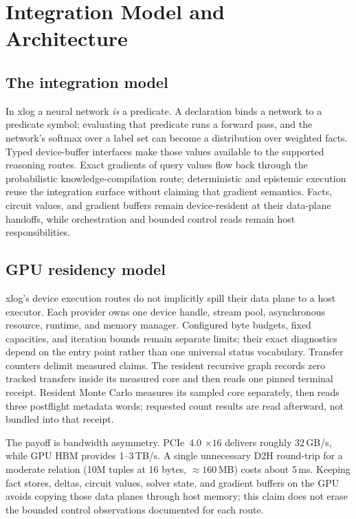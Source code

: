 \section{Integration Model and Architecture}\label{sec:arch}

\subsection{The integration model}

In xlog a neural network \emph{is} a predicate. A declaration binds a network to a predicate symbol; evaluating that predicate runs a forward pass, and the network's softmax over a label set can become a distribution over weighted facts. Typed device-buffer interfaces make those values available to the supported reasoning routes. Exact gradients of query values flow back through the probabilistic knowledge-compilation route; deterministic and epistemic execution reuse the integration surface without claiming that gradient semantics. Facts, circuit values, and gradient buffers remain device-resident at their data-plane handoffs, while orchestration and bounded control reads remain host responsibilities.
\subsection{GPU residency model}

xlog's device execution routes do not implicitly spill their data plane to a host executor. Each provider owns one device handle, stream pool, asynchronous resource, runtime, and memory manager. Configured byte budgets, fixed capacities, and iteration bounds remain separate limits; their exact diagnostics depend on the entry point rather than one universal status vocabulary. Transfer counters delimit measured claims. The resident recursive graph records zero tracked transfers inside its measured core and then reads one pinned terminal receipt. Resident Monte Carlo measures its sampled core separately, then reads three postflight metadata words; requested count results are read afterward, not bundled into that receipt.

The payoff is bandwidth asymmetry. PCIe~4.0 $\times16$ delivers roughly 32\,GB/s, while GPU HBM provides 1--3\,TB/s. A single unnecessary D2H round-trip for a moderate relation (10M tuples at 16 bytes, ${\approx}160$\,MB) costs about 5\,ms. Keeping fact stores, deltas, circuit values, solver state, and gradient buffers on the GPU avoids copying those data planes through host memory; this claim does not erase the bounded control observations documented for each route.

